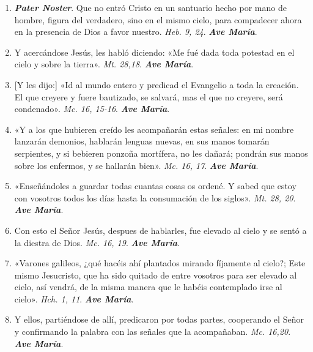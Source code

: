 \documentclass[../../devocionario.tex]{subfiles}
\begin{document}
    \begin{enumerate}
    
        \item \textbf{\emph{Pater Noster}}. Que no entró Cristo en un santuario hecho por mano de hombre, figura del verdadero, sino en el mismo cielo, para compadecer ahora en
            la presencia de Dios a favor nuestro. \emph{Heb. 9, 24}. \textbf{\emph{Ave María}}.

        \item Y acercándose Jesús, les habló diciendo: «Me fué dada toda potestad en el cielo y sobre la tierra». \emph{Mt. 28,18}. \textbf{\emph{Ave María}}.

        \item {[Y les dijo:]} «Id al mundo entero y predicad el Evangelio a toda la creación. El que creyere y fuere bautizado, 
            se salvará, mas el que no creyere, será condenado». \emph{Mc. 16, 15-16}. \textbf{\emph{Ave María}}.

        \item «Y a los que hubieren creído les acompañarán estas señales: en mi nombre lanzarán demonios, hablarán lenguas nuevas, en sus manos tomarán serpientes, 
            y si bebieren ponzoña mortífera, no les dañará; pondrán sus manos sobre los enfermos, y se hallarán bien». \emph{Mc. 16, 17}. \textbf{\emph{Ave María}}.

        \item «Enseñándoles a guardar todas cuantas cosas os ordené. Y sabed que estoy con vosotros todos los días hasta la consumación de los siglos». 
            \emph{Mt. 28, 20}. \textbf{\emph{Ave María}}.

        \item Con esto el Señor Jesús, despues de hablarles, fue elevado al cielo y se sentó a la diestra de Dios. \emph{Mc. 16, 19}. \textbf{\emph{Ave María}}.

        \item «Varones galileos, ¿qué hacéis ahí plantados mirando fíjamente al cielo?; Este mismo Jesucristo, que ha sido quitado de entre vosotros 
            para ser elevado al cielo, así vendrá, de la misma manera que le habéis contemplado irse al cielo». \emph{Hch. 1, 11}. \textbf{\emph{Ave María}}.

        \item Y ellos, partiéndose de allí, predicaron por todas partes, cooperando el Señor y confirmando la palabra con las señales que la acompañaban. 
            \emph{Mc. 16,20}. \textbf{\emph{Ave María}}.


\end{enumerate}
\end{document}
